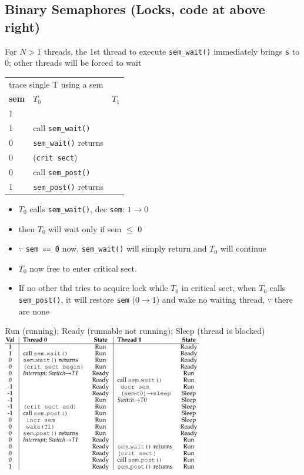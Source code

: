 \documentclass[8pt,a4paper,landscape]{extarticle}
\begin{document}
\begin{multicols*}{3}
\section*{Binary Semaphores (Locks, code at above right)}
For $N > 1$ threads, the 1st thread to execute \texttt{sem\_wait()}
immediately brings \texttt{s} to 0; other threads will be forced to wait\\
\begin{minipage}{.48\linewidth}
\begin{tabular}[th]{lll}
  \hline
  \multicolumn{3}{l}{trace single T using a sem}\\
  \textbf{sem} & $T_0$ & $T_1$\\
  \hline
  1 & & \\
  1 & call \texttt{sem\_wait()} & \\
  0 & \texttt{sem\_wait()} returns & \\
  0 & (\texttt{crit sect}) & \\
  0 & call \texttt{sem\_post()} & \\
  1 & \texttt{sem\_post()} returns\\
  \hline
\end{tabular}
\end{minipage}
\begin{minipage}{.52\linewidth}
  \flushleft
  \begin{itemize}
  \item $T_0$ calls \texttt{sem\_wait()}, dec \texttt{sem}: $1 \to 0$
  \item then $T_0$ will wait only if sem $\leq$ 0
  \item $\because$ \texttt{sem == 0} now, \texttt{sem\_wait()} will simply return and $T_0$ will continue
  \item $T_0$ now free to enter critical sect.
  \item If no other thd tries to acquire lock while $T_0$ in critical sect, when $T_0$ calls \texttt{sem\_post()}, it will restore \texttt{sem} ($0 \to 1$) and wake no waiting thread, $\because$ there are none
  \end{itemize}
\end{minipage}
Run (running); Ready (runnable not running); Sleep (thread is blocked)
\includegraphics[width=\linewidth,height=6cm]{imgs/twots_usesem2}

\end{multicols*}
\end{document}
